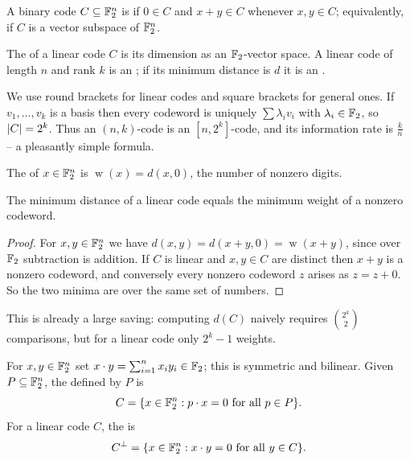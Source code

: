 \documentclass[a4paper]{scrartcl}
\DeclareMathOperator{\wt}{w}
\begin{document}
\begin{definition}
	A binary code $C \subseteq \mathbb{F}_2^n$ is  if $0 \in C$ and $x+y \in C$ whenever $x,y \in C$; equivalently, if $C$ is a vector subspace of $\mathbb{F}_2^n$.
\end{definition}

\begin{definition}[Rank]
	The  of a linear code $C$ is its dimension as an $\mathbb{F}_2$-vector space. A linear code of length $n$ and rank $k$ is an ; if its minimum distance is $d$ it is an .
\end{definition}

We use round brackets for linear codes and square brackets for general ones. If $v_1,\dots,v_k$ is a basis then every codeword is uniquely $\sum \lambda_i v_i$ with $\lambda_i \in \mathbb{F}_2$, so $\lvert C\rvert = 2^k$. Thus an $(n,k)$-code is an $[n,2^k]$-code, and its information rate is $\frac kn$ -- a pleasantly simple formula.

\begin{definition}[Weight]
	The  of $x \in \mathbb{F}_2^n$ is $\wt(x) = d(x,0)$, the number of nonzero digits.
\end{definition}

\begin{lemma}\label{lem:wtmin}
	The minimum distance of a linear code equals the minimum weight of a nonzero codeword.
\end{lemma}

\begin{proof}
	For $x,y \in \mathbb{F}_2^n$ we have $d(x,y) = d(x+y,0) = \wt(x+y)$, since over $\mathbb{F}_2$ subtraction is addition. If $C$ is linear and $x,y \in C$ are distinct then $x+y$ is a nonzero codeword, and conversely every nonzero codeword $z$ arises as $z = z + 0$. So the two minima are over the same set of numbers.
\end{proof}

This is already a large saving: computing $d(C)$ naively requires $\binom{2^k}{2}$ comparisons, but for a linear code only $2^k - 1$ weights.

\begin{definition}
	For $x,y \in \mathbb{F}_2^n$ set $x\cdot y = \sum_{i=1}^n x_iy_i \in \mathbb{F}_2$; this is symmetric and bilinear. Given $P \subseteq \mathbb{F}_2^n$, the  defined by $P$ is
	$$C = \{x \in \mathbb{F}_2^n : p\cdot x = 0 \text{ for all } p \in P\}.$$
	For a linear code $C$, the  is
	$$C^\perp = \{x \in \mathbb{F}_2^n : x\cdot y = 0 \text{ for all } y \in C\}.$$
\end{definition}
\end{document}
